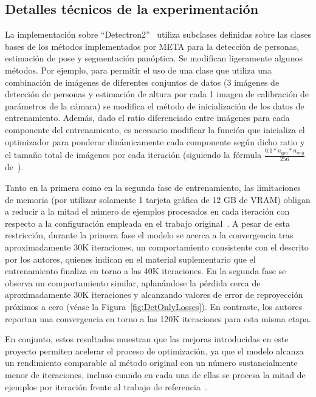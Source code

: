 \subsection{Detalles técnicos de la experimentación}\label{sec:TrainML}
La implementación sobre ``Detectron2''~\cite{detectron2} utiliza subclases definidas sobre las clases bases
de los métodos implementados por META para la detección de personas, estimación de pose y segmentación panóptica.
Se modifican ligeramente algunos métodos. Por ejemplo, para permitir el uso de una clase que utiliza una combinación de imágenes
de diferentes conjuntos de datos (3 imágenes de detección de personas y estimación de altura por cada 1 imagen de calibración de
parámetros de la cámara) se modifica el método de inicialización de los datos de entrenamiento.
Además, dado el ratio diferenciado entre imágenes para cada componente del entrenamiento, es necesario modificar la
función que inicializa el optimizador para ponderar dinámicamente cada componente según dicho ratio y el tamaño total
de imágenes por cada iteración (siguiendo la fórmula $\frac{0.1*n_{gpu}*n_{img}}{256}$ de~\cite{goyal2018accuratelargeminibatchsgd}).
\par
Tanto en la primera como en la segunda fase de entrenamiento, las limitaciones de memoria (por utilizar solamente 1 tarjeta gráfica de 12 GB de VRAM) obligan a reducir
a la mitad el número de ejemplos procesados en cada iteración con respecto a la configuración empleada en el trabajo original~\cite{SVMIW}.
A pesar de esta restricción, durante la primera fase el modelo se acerca a la convergencia tras aproximadamente 30K iteraciones,
un comportamiento consistente con el descrito por los autores, quienes indican en el material suplementario que el
entrenamiento finaliza en torno a las 40K iteraciones.
En la segunda fase se observa un comportamiento similar,
aplanándose la pérdida cerca de aproximadamente 30K iteraciones y
alcanzando valores de error de reproyección próximos a cero (véase la Figura~\ref{fig:DetOnlyLosses}).
En contraste, los autores reportan una convergencia en torno a las 120K iteraciones para esta misma etapa.
\par
En conjunto, estos resultados muestran que las mejoras introducidas en este proyecto
permiten acelerar el proceso de optimización, ya que el modelo alcanza un rendimiento
comparable al método original con un número sustancialmente menor de iteraciones,
incluso cuando en cada una de ellas se procesa la mitad de ejemplos por iteración
frente al trabajo de referencia~\cite{SVMIW}.


